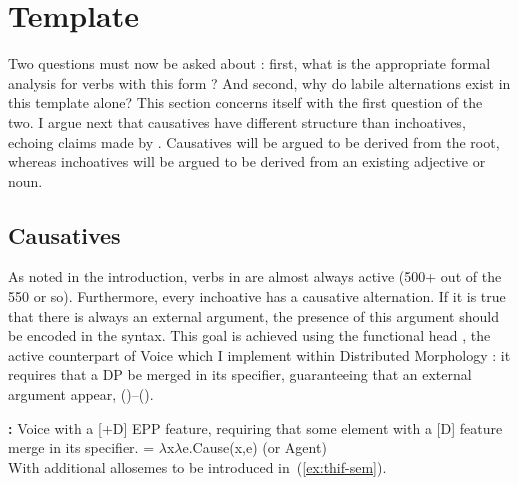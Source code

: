
\section{Template} \label{sec:template}
Two questions must now be asked about {\thif}: first, what is the appropriate formal analysis for verbs with this form \citep{schwarzwald81,bolozky82}? And second, why do labile alternations exist in this template alone?
This section concerns itself with the first question of the two. I argue next that causatives have different structure than inchoatives, echoing claims made by \cite{borer91}. Causatives will be argued to be derived from the root, whereas inchoatives will be argued to be derived from an existing adjective or noun.%

	\subsection{Causatives}
As noted in the introduction, verbs in {\thif} are almost always active (500+ out of the 550 or so). Furthermore, every inchoative has a causative alternation. If it is true that there is always an external argument, the presence of this argument should be encoded in the syntax. This goal is achieved using the functional head \textbf{\vd} \citep{schaefer08,wood15springer,nie17,osekikastner17,kastner18nllt}, the active counterpart of Voice \citep{kratzer96,pylkkanen08} which I implement within Distributed Morphology \citep{dm}: it requires that a DP be merged in its specifier, guaranteeing that an external argument appear, (\nextx)--(\anextx).\\
\begin{minipage}[t]{0.5\textwidth}
\pex 
	\a \textbf{\vd:} Voice with a [+D] EPP feature, requiring that some element with a [D] feature merge in its specifier.
	\a \denote{\vd} = $\lambda$x$\lambda$e.Cause(x,e) \hfill (or Agent)\\
	With additional allosemes to be introduced in~(\ref{ex:thif-sem}).
\xe
\end{minipage} \hfill
\begin{minipage}[t]{0.45\textwidth}
{
    \ex\label{tree:thif}
    \xe
}
\end{minipage}

